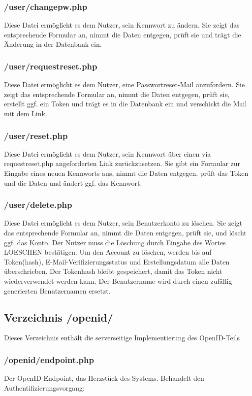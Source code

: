 \documentclass[parskip=half]{scrartcl}
\begin{document}
\subsubsection{/user/changepw.php}
Diese Datei ermöglicht es dem Nutzer, sein Kennwort zu ändern.
Sie zeigt das entsprechende Formular an, nimmt die Daten entgegen, prüft sie und trägt die Änderung in der Datenbank ein.

\subsubsection{/user/requestreset.php}
Diese Datei ermöglicht es dem Nutzer, eine Passwortreset-Mail anzufordern.
Sie zeigt das entsprechende Formular an, nimmt die Daten entgegen, prüft sie, erstellt ggf. ein Token und trägt es in die Datenbank ein und verschickt die Mail mit dem Link.

\subsubsection{/user/reset.php}
Diese Datei ermöglicht es dem Nutzer, sein Kennwort über einen via requestreset.php angeforderten Link zurückzusetzen.
Sie gibt ein Formular zur Eingabe eines neuen Kennworts aus, nimmt die Daten entgegen, prüft das Token und die Daten und ändert ggf. das Kennwort.

\subsubsection{/user/delete.php}
Diese Datei ermöglicht es dem Nutzer, sein Benutzerkonto zu löschen.
Sie zeigt das entsprechende Formular an, nimmt die Daten entgegen, prüft sie, und löscht ggf. das Konto.
Der Nutzer muss die Löschung durch Eingabe des Wortes LOESCHEN bestätigen.
Um den Account zu löschen, werden bis auf Token(hash), E-Mail-Verifizierungsstatus und Erstellungsdatum alle Daten überschrieben.
Der Tokenhash bleibt gespeichert, damit das Token nicht wiederverwendet werden kann.
Der Benutzername wird durch einen zufällig generierten Benutzernamen ersetzt.

\subsection{Verzeichnis /openid/}
Dieses Verzeichnis enthält die serverseitige Implementierung des OpenID-Teils

\subsubsection{/openid/endpoint.php}
Der OpenID-Endpoint, das Herzstück des Systems.
Behandelt den Authentifizierungsvorgang:
\end{document}
